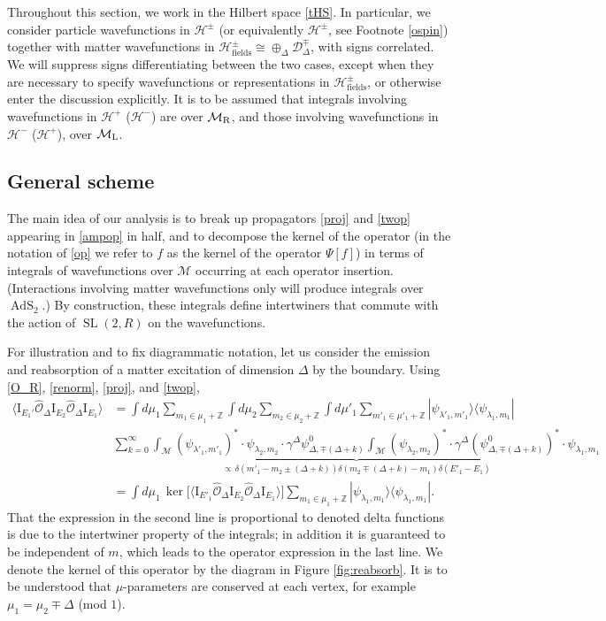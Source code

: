 \documentclass[12pt]{article}
\newcommand{\nn}{\nonumber\\}
\newcommand{\blangle}{\bigl\langle}
\newcommand{\brangle}{\bigr\rangle}
\newcommand*{\bra}[1]{\langle{#1}|}
\newcommand*{\ket}[1]{|{#1}\rangle}
\newcommand*{\bcorr}[1]{\blangle{#1}\brangle}
\newcommand{\calD}{\mathcal{D}}
\newcommand{\calH}{\mathcal{H}}
\newcommand{\calM}{\mathcal{M}}
\newcommand{\calO}{\mathcal{O}}
\newcommand{\ZZ}{\mathbb{Z}}
\newcommand{\RR}{\mathbb{R}}
\DeclareMathOperator{\tSL}{\widetilde{\mathrm{SL}}}
\DeclareMathOperator{\tAdS}{\widetilde{AdS}}
\newcommand{\Iota}{\mathrm{I}}
\newcommand{\lam}{\lambda}
\newcommand{\ga}{\gamma}
\newcommand{\de}{\delta}
\newcommand{\De}{\Delta}
\def\widetilde#1{#1}%
\def\RR{R}
\begin{document}
Throughout this section, we work in the Hilbert space \eqref{tHS}. In particular, we consider particle wavefunctions in $\calH^{\pm}$ (or equivalently $\widetilde{\calH}^{\pm}$, see Footnote \ref{ospin})  together with matter wavefunctions in $\calH_{\text{fields}}^{\pm}\cong \oplus_{\De}\calD^{\mp}_{\De}$, with signs correlated. We will suppress signs differentiating between the two cases, except when they are necessary to specify wavefunctions or representations in $\calH_{\text{fields}}^{\pm}$, or otherwise enter the discussion explicitly. It is to be assumed that integrals involving wavefunctions in $\calH^{+}$ ($\widetilde{\calH}^-$) are over $\calM_{\rm R}$, and those involving wavefunctions in $\calH^{-}$ ($\widetilde{\calH}^+$), over $\calM_{\rm L}$. 

\subsection{General scheme} \label{sec:scheme}

The main idea of our analysis is to break up propagators \eqref{proj} and \eqref{twop} appearing in \eqref{ampop} in half, and to decompose the kernel of the operator (in the notation of \eqref{op} we refer to $f$ as the kernel of the operator $\Psi[f]$) in terms of integrals of wavefunctions over $\calM$ occurring at each operator insertion. (Interactions involving matter wavefunctions only will produce integrals over $\tAdS_2$.) By construction, these integrals define intertwiners that commute with the action of $\tSL(2,\RR)$ on the wavefunctions.


For illustration and to fix diagrammatic notation, let us consider the emission and reabsorption of a matter excitation of dimension $\De$ by the boundary. Using \eqref{O_R}, \eqref{renorm}, \eqref{proj}, and \eqref{twop}, 
\begin{align}
\bcorr{\Iota_{E_1'}\hat{\calO}_{\De}\Iota_{E_2}\hat{\calO}_{\De} \Iota_{E_1}}&=\int d\mu_1 \sum_{m_1\in \mu_1 +\ZZ}\int d\mu_2\sum_{m_2 \in \mu_2+\ZZ}\int d\mu'_1 \sum_{m'_1 \in \mu'_1+\ZZ}\ket{\psi_{\lam'_1, m'_1}}\bra{\psi_{\lam_1,m_1}}\nn
&\underbrace{\sum_{k=0}^{\infty}\int_{\calM}\left(\psi_{\lam'_1, m'_1}\right)^*\cdot \psi_{\lam_2, m_2}\cdot\ga^{\De}\psi^{0}_{\De,\mp( \De+k)}\int_{\calM}\left(\psi_{\lam_2, m_2}\right)^*\cdot\ga^{\De}\left(\psi^{0}_{\De, \mp(\De+k)}\right)^*\cdot \psi_{\lam_1,m_1} }_{\propto\, \de(m'_1-m_2\pm (\De+k))\de(m_2\mp(\De+k)-m_1)\de(E'_1-E_1)} \nn
&=\int d\mu_1\, \ker\big[\bcorr{\Iota_{E'_1}\hat{\calO}_{\De}\Iota_{E_2}\hat{\calO}_{\De} \Iota_{E_1}}\big]\sum_{m_1 \in \mu_1+\ZZ} \ket{\psi_{\lam_1, m_1}}\bra{\psi_{\lam_1,m_1}}.
\end{align}
That the expression in the second line is proportional to denoted delta functions is due to the intertwiner property of the integrals; in addition it is guaranteed to be independent of $m$, which leads to the operator expression in the last line. We denote the kernel of this operator by the diagram in Figure \ref{fig:reabsorb}. It is to be understood that $\mu$-parameters are conserved at each vertex, for example $\mu_1=\mu_2 \mp \Delta$ (mod $1$). 
\end{document}

